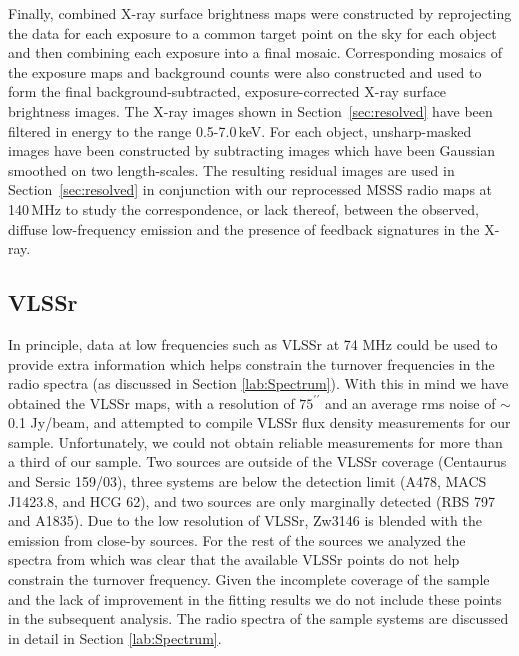 \documentclass{aa}  %
\begin{document}
Finally, combined X-ray surface brightness maps were constructed by reprojecting the data for each exposure to a common target point on the sky for each object and then combining each exposure into a final mosaic. Corresponding mosaics of the exposure maps and background counts were also constructed and used to form the final background-subtracted, exposure-corrected X-ray surface brightness images. The X-ray images shown in Section~\ref{sec:resolved} have been filtered in energy to the range 0.5-7.0\,keV. For each object, unsharp-masked images have been constructed by subtracting images which have been Gaussian smoothed on two length-scales. The resulting residual images are used in Section~\ref{sec:resolved} in conjunction with our reprocessed MSSS radio maps at 140\,MHz to study the correspondence, or lack thereof, between the observed, diffuse low-frequency emission and the presence of feedback signatures in the X-ray.





\subsection{VLSSr}
\label{subsec:VLSSr}

In principle, data at low frequencies such as VLSSr at 74 MHz \citep{Cohen2007, Lane2012, Lane2014} could be used to provide extra information which helps constrain the turnover frequencies in the radio spectra (as discussed in Section \ref{lab:Spectrum}).
With this in mind we have obtained the VLSSr maps, with a resolution of $75^{\prime\prime}$ and an average rms noise of $\sim$0.1 Jy/beam, and attempted to compile VLSSr flux density measurements for our sample.
Unfortunately, we could not obtain reliable measurements for more than a third of our sample.
Two sources are outside of the VLSSr coverage (Centaurus and Sersic 159/03), three systems are below the detection limit (A478, MACS J1423.8, and HCG 62), and two sources are only marginally detected (RBS 797 and A1835). Due to the low resolution of VLSSr, Zw3146 is blended with the emission from close-by sources. 
For the rest of the sources we analyzed the spectra from which was clear that the available VLSSr points do not help constrain the turnover frequency.
Given the incomplete coverage of the sample and the lack of improvement in the fitting results we do not include these points in the subsequent analysis.
The radio spectra of the sample systems are discussed in detail in Section \ref{lab:Spectrum}.
\end{document}
